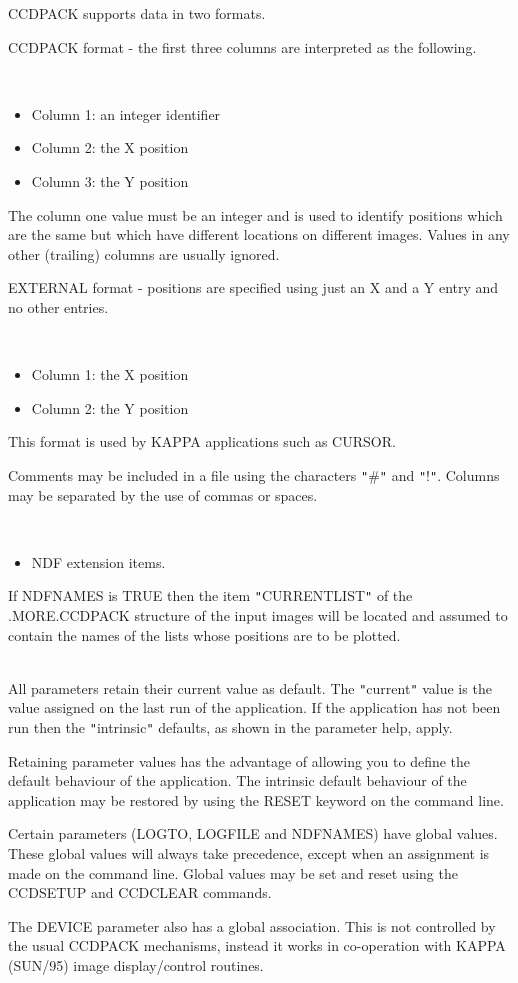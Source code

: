 \documentclass[twoside,11pt]{article}
\newcommand{\htmlref}[2]{#1}
\newcommand{\xref}[3]{#1}
\renewcommand{\_}{\texttt{\symbol{95}}}
\newcommand{\qt}[1]{{\tt "}#1{\tt "}}
\newcommand{\xroutine}[1]{\htmlref{{\sc #1}}{#1}}
\newcommand{\sstdiytopic}[2]{\item[#1:] \mbox{} \\[1.3ex] #2}
\newcommand{\sstitemlist}[1]{
  \mbox{} \\
  \vspace{-3.5ex}
  \begin{itemize}
     #1
  \end{itemize}
}
\newcommand{\sstitem}{\item}
\newcommand{\sstdiytopic}[2]{\item[{#1}] #2 }
\newcommand{\sstitemlist}[1]{
      \begin{itemize}
         #1
      \end{itemize}
      \\
   }
\newcommand{\sstitem}{\item}
\begin{document}
{{{             CCDPACK supports data in two formats.

             CCDPACK format - the first three columns are interpreted as the
             following.

             \sstitemlist{

                \sstitem
                  Column 1: an integer identifier

                \sstitem
                  Column 2: the X position

                \sstitem
                  Column 3: the Y position
             }
             The column one value must be an integer and is used to identify
             positions which are the same but which have different locations
             on different images. Values in any other (trailing) columns are
             usually ignored.

             EXTERNAL format - positions are specified using just an X and
             a Y entry and no other entries.
             \sstitemlist{

                \sstitem
                  Column 1: the X position

                \sstitem
                  Column 2: the Y position

            }
            This format is used by KAPPA applications such as
            \xref{CURSOR}{sun95}{CURSOR}.

            Comments may be included in a file using the characters \qt{\#} and
            \qt{!}. Columns may be separated by the use of commas or spaces.

            \sstitemlist{

               \sstitem
                 NDF extension items.

           }
           If NDFNAMES is TRUE then the item \qt{CURRENT\_LIST} of the
           .MORE.CCDPACK structure of the input images will be located
           and assumed to contain the names of the lists whose positions
           are to be plotted.
     }
   }
   \sstdiytopic{
      Behaviour of parameters
   } {
      All parameters retain their current value as default. The
      \qt{current} value is the value assigned on the last run of the
      application. If the application has not been run then the
      \qt{intrinsic} defaults, as shown in the parameter help, apply.

      Retaining parameter values has the advantage of allowing you to
      define the default behaviour of the application. The intrinsic
      default behaviour of the application may be restored by using the
      RESET keyword on the command line.

      Certain parameters (LOGTO, LOGFILE and NDFNAMES) have global
      values. These global values will always take precedence, except
      when an assignment is made on the command line. Global values may
      be set and reset using the \xroutine{CCDSETUP} and \xroutine{CCDCLEAR} commands.

      The DEVICE parameter also has a global association. This is not
      controlled by the usual CCDPACK mechanisms, instead it works in
      co-operation with \xref{KAPPA (SUN/95)}{sun95}{} image
      display/control routines.
   }
}
\end{document}
